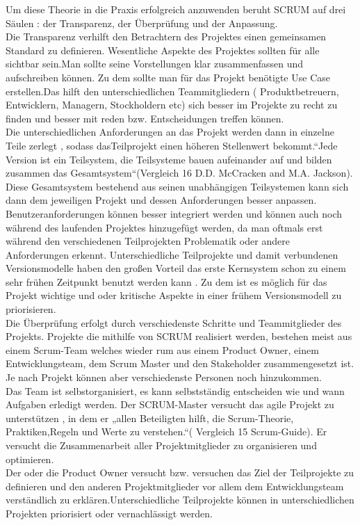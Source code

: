 \documentclass[a4paper, 10pt]{scrartcl}
\begin{document}
Um diese Theorie in die Praxis erfolgreich anzuwenden beruht SCRUM auf drei Säulen : 
der Transparenz, der Überprüfung und der Anpassung.\\
Die Transparenz verhilft den Betrachtern des Projektes einen gemeinsamen Standard zu definieren. Wesentliche Aspekte des Projektes sollten für alle sichtbar sein.Man sollte seine Vorstellungen klar zusammenfassen und aufschreiben können. Zu dem sollte man für das Projekt benötigte Use Case erstellen.Das hilft den unterschiedlichen Teammitgliedern ( Produktbetreuern, Entwicklern, Managern, Stockholdern etc) sich besser im Projekte zu recht zu finden und besser mit reden bzw. Entscheidungen treffen können.\\
Die unterschiedlichen Anforderungen an das Projekt werden dann in einzelne Teile zerlegt , sodass dasTeilprojekt einen höheren Stellenwert bekommt.“Jede Version ist ein Teilsystem, die Teilsysteme bauen aufeinander auf und bilden zusammen das Gesamtsystem“(Vergleich 16 D.D. McCracken and M.A. Jackson). Diese Gesamtsystem bestehend aus seinen unabhängigen Teilsystemen kann sich dann dem jeweiligen Projekt und dessen Anforderungen besser anpassen. Benutzeranforderungen können besser integriert werden und können auch noch während des laufenden Projektes hinzugefügt werden, da man oftmals erst während den verschiedenen Teilprojekten Problematik oder andere Anforderungen erkennt. Unterschiedliche Teilprojekte und damit verbundenen Versionsmodelle haben den großen Vorteil das erste Kernsystem schon zu einem sehr frühen Zeitpunkt benutzt werden kann . Zu dem ist es möglich für das Projekt wichtige und oder kritische Aspekte in einer frühem Versionsmodell zu priorisieren.\\
Die Überprüfung erfolgt durch verschiedenste Schritte und Teammitglieder des Projekts. Projekte die mithilfe von SCRUM realisiert werden, bestehen meist aus einem Scrum-Team welches wieder rum aus einem Product Owner, einem Entwicklungsteam, dem Scrum Master und den Stakeholder zusammengesetzt ist. Je nach Projekt können aber verschiedenste Personen noch hinzukommen.\\
Das Team ist selbstorganisiert, es kann selbstständig entscheiden wie und wann Aufgaben erledigt werden. Der SCRUM-Master versucht das agile Projekt zu unterstützen , in dem er „allen Beteiligten hilft, die Scrum-Theorie, Praktiken,Regeln und Werte zu verstehen.“( Vergleich 15 Scrum-Guide). Er versucht die Zusammenarbeit aller Projektmitglieder zu organisieren und optimieren.\\
Der oder die Product Owner versucht bzw. versuchen das Ziel der Teilprojekte zu definieren und den anderen Projektmitglieder vor allem dem Entwicklungsteam verständlich zu erklären.Unterschiedliche Teilprojekte können in unterschiedlichen Projekten priorisiert oder vernachlässigt werden.\\
\end{document}
